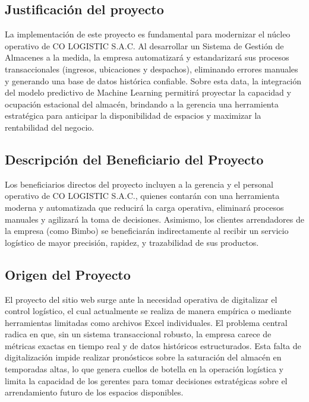 \documentclass[11pt, a4paper, oneside]{report}
\begin{document}
\subsection{Justificación del proyecto}

La implementación de este proyecto es fundamental para modernizar el núcleo operativo de CO LOGISTIC S.A.C. Al desarrollar un Sistema de Gestión de Almacenes a la medida, la empresa automatizará y estandarizará sus procesos transaccionales (ingresos, ubicaciones y despachos), eliminando errores manuales y generando una base de datos histórica confiable. Sobre esta data, la integración del modelo predictivo de Machine Learning permitirá proyectar la capacidad y ocupación estacional del almacén, brindando a la gerencia una herramienta estratégica para anticipar la disponibilidad de espacios y maximizar la rentabilidad del negocio.

\subsection{Descripción del Beneficiario del Proyecto}

Los beneficiarios directos del proyecto incluyen a la gerencia y el personal operativo de CO LOGISTIC S.A.C., quienes contarán con una herramienta moderna y automatizada que reducirá la carga operativa, eliminará procesos manuales y agilizará la toma de decisiones. Asimismo, los clientes arrendadores de la empresa (como Bimbo) se beneficiarán indirectamente al recibir un servicio logístico de mayor precisión, rapidez, y trazabilidad de sus productos.

\subsection{Origen del Proyecto}

El proyecto del sitio web surge ante la necesidad operativa de digitalizar el control logístico, el cual actualmente se realiza de manera empírica o mediante herramientas limitadas como archivos Excel individuales. El problema central radica en que, sin un sistema transaccional robusto, la empresa carece de métricas exactas en tiempo real y de datos históricos estructurados. Esta falta de digitalización impide realizar pronósticos sobre la saturación del almacén en temporadas altas, lo que genera cuellos de botella en la operación logística y limita la capacidad de los gerentes para tomar decisiones estratégicas sobre el arrendamiento futuro de los espacios disponibles.
\end{document}
